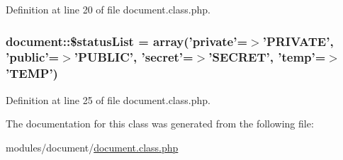 Definition at line 20 of file document.\+class.\+php.

\hypertarget{classdocument_a93e1c85a4ec17a1471b874fdb14cce58}{
\subsubsection[{\$status\+List}]{\setlength{\rightskip}{0pt plus 5cm}document\+::\$status\+List = array('private'=$>$'P\+R\+I\+V\+A\+T\+E', 'public'=$>$'P\+U\+B\+L\+I\+C', 'secret'=$>$'S\+E\+C\+R\+E\+T', 'temp'=$>$'T\+E\+M\+P')}}\label{classdocument_a93e1c85a4ec17a1471b874fdb14cce58}


Definition at line 25 of file document.\+class.\+php.



The documentation for this class was generated from the following file\+:\begin{DoxyCompactItemize}
\item 
modules/document/\hyperlink{document_8class_8php}{document.\+class.\+php}\end{DoxyCompactItemize}
